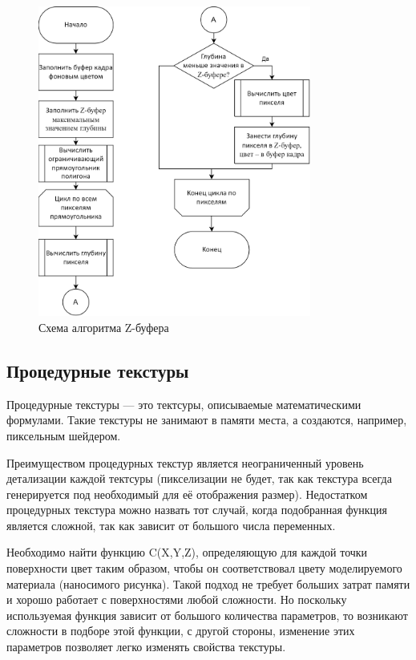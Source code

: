 \begin{figure}[h]
	\centering
	\includegraphics[width=0.8\textwidth]{img/algorithms/alg-z-buffer.png}
	\caption{Схема алгоритма Z-буфера}
	\label{fig:z-buffer}
\end{figure}
\clearpage

\subsection{Процедурные текстуры}
Процедурные текстуры --- это тектсуры, описываемые математическими формулами. Такие текстуры не занимают в памяти места, а создаются, например, пиксельным шейдером.

Преимуществом процедурных текстур является неограниченный уровень детализации каждой тектсуры (пикселизации не будет, так как текстура всегда генерируется под необходимый для её отображения размер). Недостатком процедурных текстура можно назвать тот случай, когда подобранная функция является сложной, так как зависит от большого числа переменных.

Необходимо найти функцию C(X,Y,Z), определяющую для каждой точки поверхности цвет таким образом, чтобы он соответствовал цвету моделируемого материала (наносимого рисунка). Такой подход не требует больших затрат памяти и хорошо работает с поверхностями любой сложности. Но поскольку используемая функция зависит от большого количества параметров, то возникают сложности в подборе этой функции, с другой стороны, изменение этих параметров позволяет легко изменять свойства текстуры.


